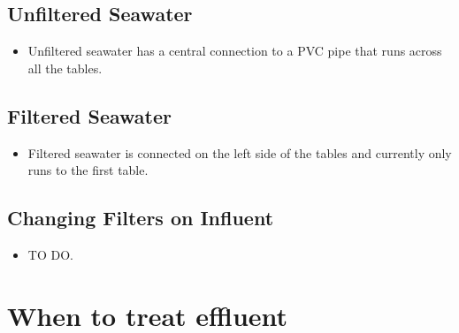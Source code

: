 \documentclass[
  letterpaper,
  DIV=11,
  numbers=noendperiod]{scrreprt}
\providecommand{\tightlist}{%
  \setlength{\itemsep}{0pt}\setlength{\parskip}{0pt}}\usepackage{longtable,booktabs,array}
\begin{document}
\hypertarget{unfiltered-seawater}{%
\subsection*{\texorpdfstring{\textbf{Unfiltered
Seawater}}{Unfiltered Seawater}}\label{unfiltered-seawater}}

\begin{itemize}
\tightlist
\item
  Unfiltered seawater has a central connection to a PVC pipe that runs
  across all the tables.
\end{itemize}

\hypertarget{filtered-seawater}{%
\subsection*{\texorpdfstring{\textbf{Filtered
Seawater}}{Filtered Seawater}}\label{filtered-seawater}}

\begin{itemize}
\tightlist
\item
  Filtered seawater is connected on the left side of the tables and
  currently only runs to the first table.
\end{itemize}

\hypertarget{changing-filters-on-influent}{%
\subsection*{\texorpdfstring{\textbf{Changing Filters on
Influent}}{Changing Filters on Influent}}\label{changing-filters-on-influent}}

\begin{itemize}
\tightlist
\item
  TO DO.
\end{itemize}

\hypertarget{when-to-treat-effluent}{%
\section*{\texorpdfstring{\textbf{When to treat
effluent}}{When to treat effluent}}\label{when-to-treat-effluent}}

\end{document}
